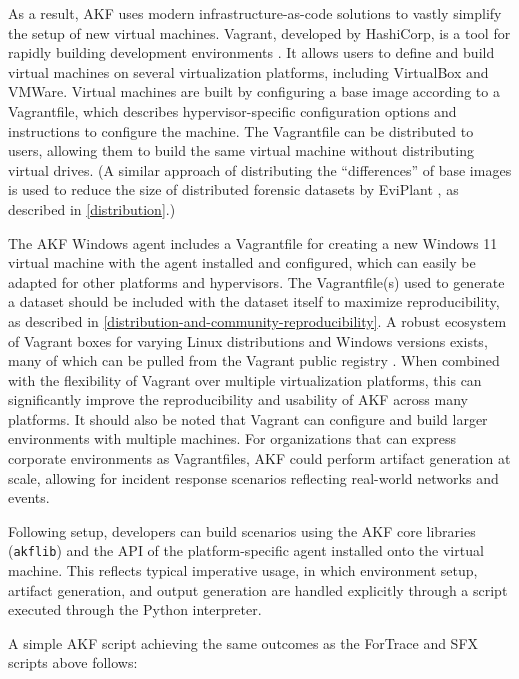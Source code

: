 \documentclass[letterpaper,12pt]{report}
\newcommand{\passthrough}[1]{#1}
\begin{document}
As a result, AKF uses modern infrastructure-as-code solutions to vastly
simplify the setup of new virtual machines. Vagrant, developed by
HashiCorp, is a tool for rapidly building development environments
\cite{HashicorpVagrant2025}. It allows users to define and build
virtual machines on several virtualization platforms, including
VirtualBox and VMWare. Virtual machines are built by configuring a base
image according to a Vagrantfile, which describes hypervisor-specific
configuration options and instructions to configure the machine. The
Vagrantfile can be distributed to users, allowing them to build the same
virtual machine without distributing virtual drives. (A similar approach
of distributing the ``differences'' of base images is used to reduce the
size of distributed forensic datasets by EviPlant
\cite{scanlonEviPlantEfficientDigital2017}, as described in
\autoref{distribution}.)

The AKF Windows agent includes a Vagrantfile for creating a new Windows
11 virtual machine with the agent installed and configured, which can
easily be adapted for other platforms and hypervisors. The
Vagrantfile(s) used to generate a dataset should be included with the
dataset itself to maximize reproducibility, as described in \autoref{distribution-and-community-reproducibility}. A robust ecosystem of Vagrant boxes for varying Linux
distributions and Windows versions exists, many of which can be pulled
from the Vagrant public registry
\cite{hashicorpHashiCorpCloudPlatform}. When combined with the
flexibility of Vagrant over multiple virtualization platforms, this can
significantly improve the reproducibility and usability of AKF across
many platforms. It should also be noted that Vagrant can configure and
build larger environments with multiple machines. For organizations that
can express corporate environments as Vagrantfiles, AKF could perform
artifact generation at scale, allowing for incident response scenarios
reflecting real-world networks and events.

Following setup, developers can build scenarios using the AKF core
libraries (\passthrough{\lstinline!akflib!}) and the API of the
platform-specific agent installed onto the virtual machine. This
reflects typical imperative usage, in which environment setup, artifact
generation, and output generation are handled explicitly through a
script executed through the Python interpreter.

A simple AKF script achieving the same outcomes as the ForTrace and SFX
scripts above follows:
\end{document}

